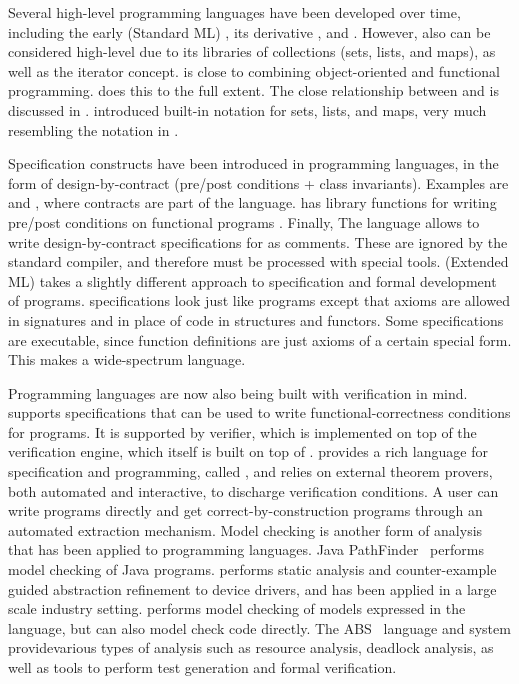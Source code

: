 Several high-level programming languages have been developed over
time, including the early \sml{} (Standard ML) \cite{standard-ml-97},
its derivative \ocaml{} \cite{ocaml}, and \haskell{}
\cite{haskell}. However, also \java{} can be considered high-level due
to its libraries of collections (sets, lists, and maps), as well as
the iterator concept. \python{} \cite{python} is close to combining
object-oriented and functional programming. \scala{} \cite{scala} does
this to the full extent. The close relationship between \scala{} and
\vdm{} is discussed in \cite{havelund-scala-vdm-12}.  \fortress{}
\cite{fortress} introduced built-in notation for sets, lists, and
maps, very much resembling the notation in \vdm{}.

Specification constructs have been introduced in programming
languages, in the form of design-by-contract (pre/post conditions +
class invariants). Examples are \eiffel{} \cite{eiffel} and
\specsharp{} \cite{specsharp}, where contracts are part of the
language. \scala{} has library functions for writing pre/post
conditions on functional programs \cite{odersky-rv10}. Finally, The
\jml{} language \cite{jml} allows to write design-by-contract
specifications for \java{} as comments. These are ignored by the
standard \java{} compiler, and therefore must be processed with
special tools. \eml{} (Extended ML) \cite{sannella-eml-97} takes a
slightly different approach to specification and formal development of
\sml{} programs.  \eml{} specifications look just like \sml{} programs
except that axioms are allowed in signatures and in place of code in
structures and functors. Some \eml{} specifications are executable,
since \sml{} function definitions are just axioms of a certain special
form. This makes \eml{} a wide-spectrum language.

Programming languages are now also being built with verification in
mind.  \dafny{} \cite{leino-lpar-2010} supports specifications that
can be used to write functional-correctness conditions for programs.
It is supported by verifier, which is implemented on top of the
\boogie{} verification engine, which itself is built on top of
\zthree.  \whythree{} \cite{filliatre-why3-2011} provides a rich
language for specification and programming, called \whyml{}, and
relies on external theorem provers, both automated and interactive, to
discharge verification conditions. A user can write \whyml{} programs
directly and get correct-by-construction \ocaml{} programs through an
automated extraction mechanism. Model checking is another form of
analysis that has been applied to programming languages.  Java
PathFinder~\cite{havelund-jpf-00,havelund-visser02} performs model
checking of Java programs. \slam{} \cite{ball2010slam2} performs
static analysis and counter-example guided abstraction refinement to
device drivers, and has been applied in a large scale industry
setting.  \spin{} \cite{holzmann-spin-2004} performs model checking of
models expressed in the \promela{} language, but can also model check
\clang{} code directly. The ABS~\cite{hahnle2012abstract} language and
system providevarious types of analysis such as resource analysis,
deadlock analysis, as well as tools to perform test generation and
formal verification.


